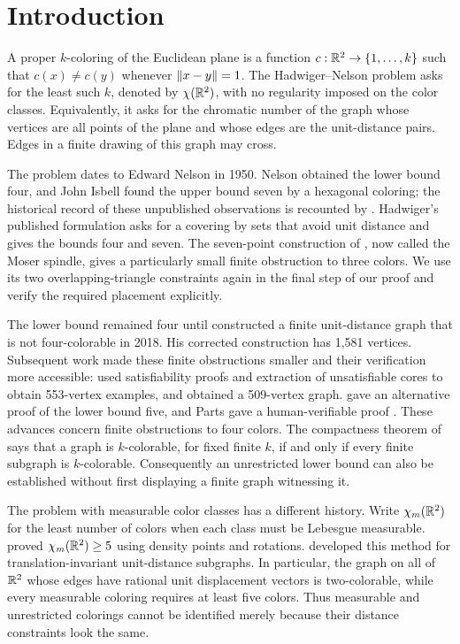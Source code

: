 \section{Introduction}\label{sec:introduction}

A proper $k$-coloring of the Euclidean plane is a function
$c:\mathbb R^2\to\{1,\ldots,k\}$ such that $c(x)\ne c(y)$ whenever
$\lVert x-y\rVert=1$. The Hadwiger--Nelson problem asks for the least such
$k$, denoted by $\chi(\mathbb R^2)$, with no regularity imposed on the color
classes. Equivalently, it asks for the chromatic number of the graph
whose vertices are all points of the plane and whose edges are the
unit-distance pairs. Edges in a finite drawing of this graph may cross.

The problem dates to Edward Nelson in 1950. Nelson obtained the lower
bound four, and John Isbell found the upper bound seven by a hexagonal
coloring; the historical record of these unpublished observations is
recounted by \citet[pp.~15--19]{Soifer2003History}. Hadwiger's published
formulation \citep{Hadwiger1961} asks for a covering by sets that avoid
unit distance and gives the bounds four and seven. The seven-point
construction of \citet{MoserMoser1961}, now called the Moser spindle,
gives a particularly small finite obstruction to three colors. We use
its two overlapping-triangle constraints again in the final step of our
proof and verify the required placement explicitly.

The lower bound remained four until \citet{deGrey2018} constructed a
finite unit-distance graph that is not four-colorable in 2018.
His corrected construction has 1,581 vertices. Subsequent work made
these finite obstructions smaller and their verification more accessible:
\citet{Heule2018} used satisfiability proofs and extraction of
unsatisfiable cores to obtain 553-vertex examples, and
\citet{Parts2020Minimization} obtained a 509-vertex graph.
\citet{ExooIsmailescu2020} gave an alternative proof of the lower bound five,
and Parts gave a human-verifiable proof \citep{Parts2020Human}.
These advances concern finite obstructions to four colors. The
compactness theorem of \citet[Theorem~1]{deBruijnErdos1951} says that a
graph is $k$-colorable, for fixed finite $k$, if and only if every finite
subgraph is $k$-colorable. Consequently an unrestricted lower bound can
also be established without first displaying a finite graph witnessing
it.

The problem with measurable color classes has a different history.
Write $\chi_m(\mathbb R^2)$ for the least number of colors when each class must
be Lebesgue measurable. \citet{Falconer1981} proved
$\chi_m(\mathbb R^2)\ge5$ using density points and rotations.
\citet{Payne2009} developed this method for translation-invariant
unit-distance subgraphs. In particular, the graph on all of $\mathbb R^2$
whose edges have rational unit displacement vectors is two-colorable,
while every measurable coloring requires at least five colors. Thus
measurable and unrestricted colorings cannot be identified merely
because their distance constraints look the same.

